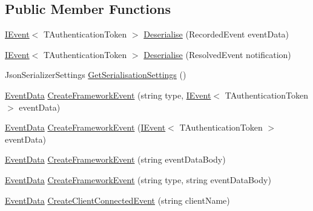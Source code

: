 \subsection*{Public Member Functions}
\begin{DoxyCompactItemize}
\item 
\hyperlink{interfaceCqrs_1_1Events_1_1IEvent}{I\+Event}$<$ T\+Authentication\+Token $>$ \hyperlink{classCqrs_1_1EventStore_1_1EventFactory_abfd04f6833e4f010234d84a591f6eb6b_abfd04f6833e4f010234d84a591f6eb6b}{Deserialise} (Recorded\+Event event\+Data)
\item 
\hyperlink{interfaceCqrs_1_1Events_1_1IEvent}{I\+Event}$<$ T\+Authentication\+Token $>$ \hyperlink{classCqrs_1_1EventStore_1_1EventFactory_a1be7f3c4014991bc4b9619eaa2e8b9a4_a1be7f3c4014991bc4b9619eaa2e8b9a4}{Deserialise} (Resolved\+Event notification)
\item 
Json\+Serializer\+Settings \hyperlink{classCqrs_1_1EventStore_1_1EventFactory_a4e52c4fd639d1af97b1ecc5052189783_a4e52c4fd639d1af97b1ecc5052189783}{Get\+Serialisation\+Settings} ()
\item 
\hyperlink{classCqrs_1_1Events_1_1EventData}{Event\+Data} \hyperlink{classCqrs_1_1EventStore_1_1EventFactory_a91394437675f3185d2105c6a79f7b5aa_a91394437675f3185d2105c6a79f7b5aa}{Create\+Framework\+Event} (string type, \hyperlink{interfaceCqrs_1_1Events_1_1IEvent}{I\+Event}$<$ T\+Authentication\+Token $>$ event\+Data)
\item 
\hyperlink{classCqrs_1_1Events_1_1EventData}{Event\+Data} \hyperlink{classCqrs_1_1EventStore_1_1EventFactory_ae514998a8368283f882014cc0db5b2b2_ae514998a8368283f882014cc0db5b2b2}{Create\+Framework\+Event} (\hyperlink{interfaceCqrs_1_1Events_1_1IEvent}{I\+Event}$<$ T\+Authentication\+Token $>$ event\+Data)
\item 
\hyperlink{classCqrs_1_1Events_1_1EventData}{Event\+Data} \hyperlink{classCqrs_1_1EventStore_1_1EventFactory_adbcf9f3c67cfef3fe894e5fb53e8b800_adbcf9f3c67cfef3fe894e5fb53e8b800}{Create\+Framework\+Event} (string event\+Data\+Body)
\item 
\hyperlink{classCqrs_1_1Events_1_1EventData}{Event\+Data} \hyperlink{classCqrs_1_1EventStore_1_1EventFactory_a9e04e262a8af8f60bdde7b4bf3eafebb_a9e04e262a8af8f60bdde7b4bf3eafebb}{Create\+Framework\+Event} (string type, string event\+Data\+Body)
\item 
\hyperlink{classCqrs_1_1Events_1_1EventData}{Event\+Data} \hyperlink{classCqrs_1_1EventStore_1_1EventFactory_a237daf998b545d170ab9f30187a0b8e7_a237daf998b545d170ab9f30187a0b8e7}{Create\+Client\+Connected\+Event} (string client\+Name)
\end{DoxyCompactItemize}


